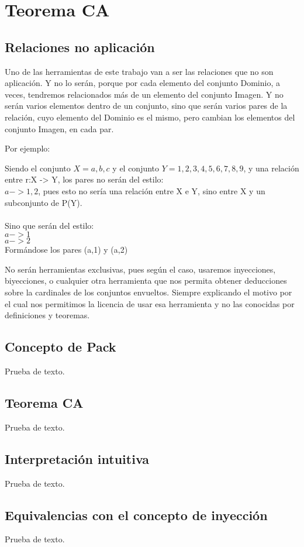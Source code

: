 \chapter{Teorema CA}

\newpage
\section{Relaciones no aplicación}
Uno de las herramientas de este trabajo van a ser las relaciones que no son aplicación. Y no lo serán, porque por cada elemento del conjunto Dominio, a veces, tendremos relacionados más de un elemento del conjunto Imagen. Y no serán varios elementos dentro de un conjunto, sino que serán varios pares de la relación, cuyo elemento del Dominio es el mismo, pero cambian los elementos del conjunto Imagen, en cada par.

Por ejemplo:

Siendo el conjunto $X={a,b,c}$ y el conjunto $Y={1,2,3,4,5,6,7,8,9}$, y una relación entre r:X -> Y, los pares no serán del estilo:\\
$a -> {1,2}$, pues esto no sería una relación entre X e Y, sino entre X y un subconjunto de P(Y).\\\\

\noindent Sino que serán del estilo:\\
$a-> 1$\\
$a-> 2$\\

Formándose los pares (a,1) y (a,2)

No serán herramientas exclusivas, pues según el caso, usaremos inyecciones, biyecciones, o cualquier otra herramienta que nos permita obtener deducciones sobre la cardinales de los conjuntos envueltos. Siempre explicando el motivo por el cual nos permitimos la licencia de usar esa herramienta y no las conocidas por definiciones y teoremas. 

\newpage
\section{Concepto de Pack}
Prueba de texto.

\newpage
\section{Teorema CA}
Prueba de texto.

\newpage
\section{Interpretación intuitiva}
Prueba de texto.

\newpage
\section{Equivalencias con el concepto de inyección}
Prueba de texto.